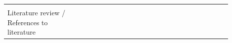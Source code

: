 \documentclass[english, 12pt, a4paper, sci, utf8, a-1b, online]{aaltothesis}
\begin{document}
{\begin{center}
\begin{longtable}{p{0.3\linewidth}p{0.6\linewidth}}
      \hline                                                                                                                                                                                                                                                                                                                                                                                                                                                                                                                                                                                                                                                                                                                                                                                                                                                                                                                                                                                            \\
      Literature review / References to literature & \textcite{what-is-api-developer-experience-and-why-it-matters} \newline \textcite{what-exactly-is-developer-experience}                                                                                                                                                                                                                                                                                                                                                                                                                                                                                                                                                                                                                                                                                                                                                                                                                            \\

\end{longtable}
\end{center}}
\end{document}
